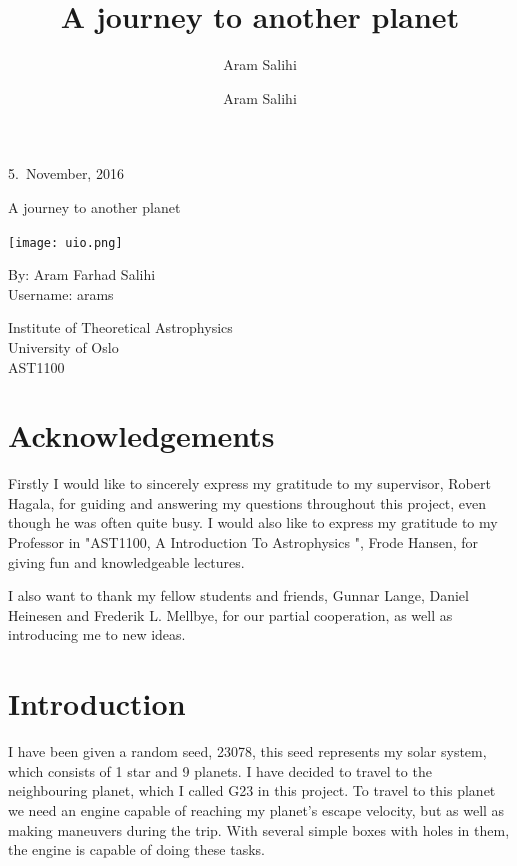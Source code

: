 \documentclass[a4paper,11pt,english]{report}
\title{A journey to another planet}
\author{Aram Salihi}
\begin{document}
\begin{flushright}
  \small 5.~November, 2016
\end{flushright}
\vspace{10mm}

\begin{center}
  \vspace{5mm}
  \huge A journey to another planet
\end{center}
\vspace{3mm}
\begin{center}
  \texttt{[image: uio.png]}
\end{center}
\vspace{3mm}
\begin{center}
  \author{Aram Salihi}
  \large  By: Aram Farhad Salihi\\ 
  \vspace{5mm}
  \large Username: arams\\
  \vspace{3mm}
 
  \huge Institute of Theoretical Astrophysics
\\
  University of Oslo\\
    \vspace{5mm}
    \huge AST1100
\end{center}
\vspace{3mm}

\clearpage
\tableofcontents
\newpage

\section{Acknowledgements}
 Firstly I would like to sincerely express my gratitude to my supervisor, Robert
Hagala, for guiding and answering my questions throughout this project, even though
he was often quite busy. I would also like to express my gratitude to my Professor
in "AST1100, A Introduction To Astrophysics ", Frode Hansen, for giving fun and
knowledgeable lectures.

I also want to thank my fellow students and friends, Gunnar Lange, Daniel
Heinesen and Frederik L. Mellbye, for our partial cooperation, as well as introducing me to  new ideas.

\section{Introduction}
I have been given a random seed, 23078, this seed represents my
solar system, which consists of 1 star and 9 planets. I have decided to travel to
the neighbouring planet, which I called G23 in this project. To travel to this
planet we need an engine capable of reaching my planet's escape velocity,
but as well as making maneuvers during the trip. With several simple
boxes with holes in them, the engine is capable of doing these tasks.
\end{document}
